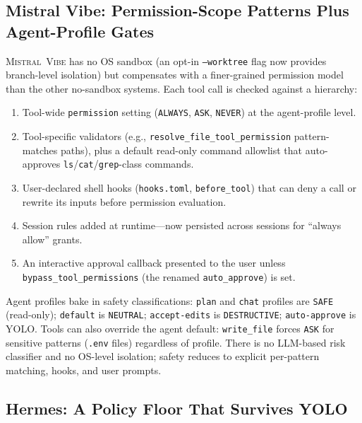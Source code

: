 \documentclass[11pt,a4paper]{article}
\newcommand{\vibe}{\textsc{Mistral~Vibe}\xspace}
\begin{document}
\subsection{Mistral Vibe: Permission-Scope Patterns Plus Agent-Profile Gates}

\vibe{} has no OS sandbox (an opt-in \texttt{--worktree} flag now provides branch-level isolation) but compensates with a finer-grained permission model than the other no-sandbox systems.
Each tool call is checked against a hierarchy:
\begin{enumerate}[itemsep=1pt]
  \item Tool-wide \texttt{permission} setting (\texttt{ALWAYS}, \texttt{ASK}, \texttt{NEVER}) at the agent-profile level.
  \item Tool-specific validators (e.g., \texttt{resolve\_file\_tool\_permission} pattern-matches paths), plus a default read-only command allowlist that auto-approves \texttt{ls}/\texttt{cat}/\texttt{grep}-class commands.
  \item User-declared shell hooks (\texttt{hooks.toml}, \texttt{before\_tool}) that can deny a call or rewrite its inputs before permission evaluation.
  \item Session rules added at runtime---now persisted across sessions for ``always allow'' grants.
  \item An interactive approval callback presented to the user unless \texttt{bypass\_tool\_permissions} (the renamed \texttt{auto\_approve}) is set.
\end{enumerate}
Agent profiles bake in safety classifications: \texttt{plan} and \texttt{chat} profiles are \texttt{SAFE} (read-only); \texttt{default} is \texttt{NEUTRAL}; \texttt{accept-edits} is \texttt{DESTRUCTIVE}; \texttt{auto-approve} is YOLO.
Tools can also override the agent default: \texttt{write\_file} forces \texttt{ASK} for sensitive patterns (\texttt{.env} files) regardless of profile.
There is no LLM-based risk classifier and no OS-level isolation; safety reduces to explicit per-pattern matching, hooks, and user prompts.

\subsection{Hermes: A Policy Floor That Survives YOLO}
\end{document}

